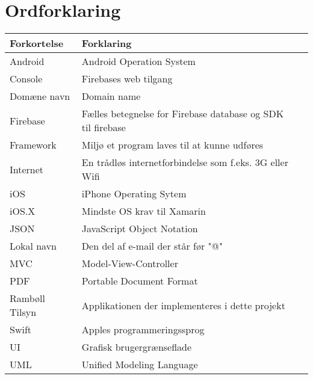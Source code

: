 \chapter*{Ordforklaring}

\begin{tabularx}{\textwidth}{l l X} \hline
	\textbf{Forkortelse}  & \textbf{Forklaring} \\ \hline
	Android& Android Operation System& \\
	Console& Firebases web tilgang& \\
	Domæne navn& Domain name\cite{DM}\\
	Firebase& Fælles betegnelse for Firebase database og SDK til firebase\\
	Framework& Miljø et program laves til at kunne udføres& \\
	Internet& En trådløs internetforbindelse som f.eks. 3G eller Wifi& \\
	iOS&  iPhone Operating Sytem& \\
	iOS.X& Mindste OS krav til Xamarin \\
	JSON& JavaScript Object Notation& \\
	Lokal navn& Den del af e-mail der står før "@"\\
	MVC& Model-View-Controller& \\
	PDF& Portable Document Format \\
	Rambøll Tilsyn& Applikationen der implementeres i dette projekt\\
	Swift& Apples programmeringssprog& \\
	UI& Grafisk brugergrænseflade& \\
	UML& Unified Modeling Language& \\
\end{tabularx}